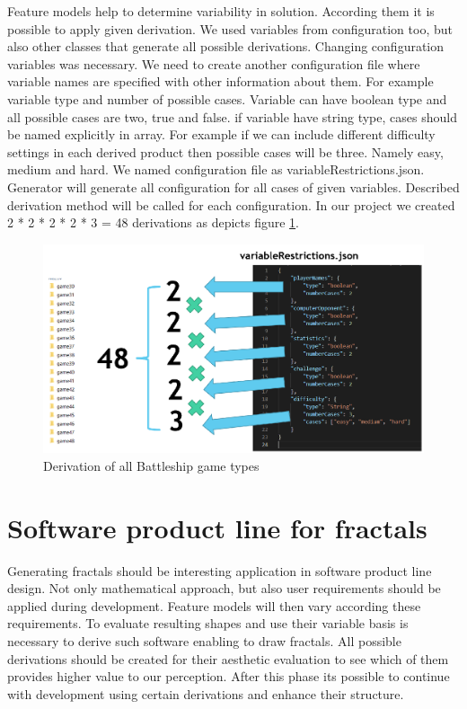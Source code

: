 \documentclass[11pt,english,a4paper,twoside]{article}
\begin{document}
Feature models help to determine variability in solution. According them it is possible to apply given derivation. We used variables from configuration too, but also other classes that generate all possible derivations. Changing configuration variables was necessary. We need to create another configuration file where variable names are specified with other information about them. For example variable type and number of possible cases. Variable can have boolean type and all possible cases are two, true and false. if variable have string type, cases should be named explicitly in array. For example if we can include different difficulty settings in each derived product then possible cases will be three. Namely easy, medium and hard. We named configuration file as variableRestrictions.json. Generator will generate all configuration for all cases of given variables. Described derivation method will be called for each configuration. In our project we created 2 * 2 * 2 * 2 * 3 = 48 derivations as depicts figure \ref{derivationBattleshipTypes}.  

\begin{figure}[!t]  %
					\begin{center}
									\includegraphics[width=\linewidth]{fig/allCases.png}
									\caption{Derivation of all Battleship game types}
									\label{derivationBattleshipTypes}
					\end{center}
\end{figure}


\section{Software product line for fractals} \label{fractalProductLine}

Generating fractals should be interesting application in software product line design. Not only mathematical approach, but also user requirements should be applied during development. Feature models will then vary according these requirements. To evaluate resulting shapes and use their variable basis is necessary to derive such software enabling to draw fractals. All possible derivations should be created for their aesthetic evaluation to see which of them provides higher value to our perception. After this phase its possible to continue with development using certain derivations and enhance their structure.
\end{document}
